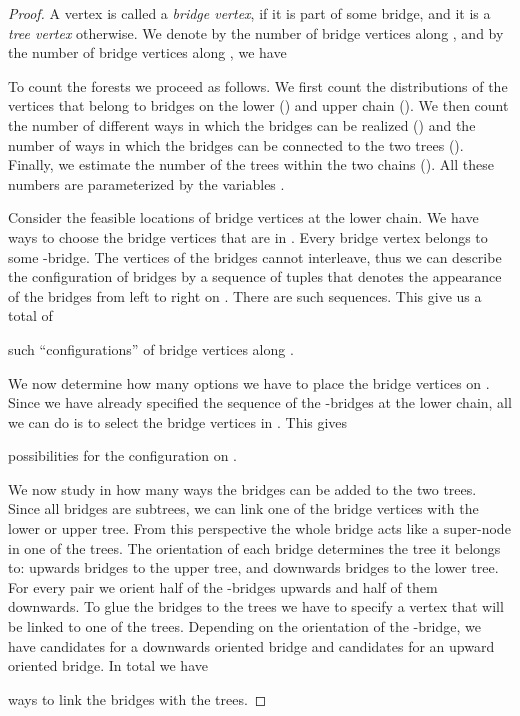 \documentclass[11pt]{article}
\begin{document}
\begin{proof}
A vertex is called a \emph{bridge vertex}, if it is part of
some bridge, and it is a \emph{tree vertex} otherwise.
We denote by  the number of bridge vertices along ,
and by 
the number of bridge vertices along , we have


To count the forests we proceed as follows. We first count the distributions of the
vertices that belong to bridges on the lower () and upper chain ().
We then count the number of different ways in which the bridges can be realized ()
and the number of ways in which the bridges can be connected to the two trees ().
Finally, we estimate the number of the trees within the two chains
(). All these numbers are parameterized by the
variables .

Consider the feasible locations of bridge vertices at the
lower chain. We have  ways to choose the bridge vertices
that are in . Every bridge vertex belongs to some -bridge. The vertices
of the bridges cannot interleave, thus we can describe the
configuration of bridges by a sequence of  tuples that denotes
the appearance of the  bridges from left to right on .
There are  such sequences. This give us a total of

such ``configurations'' of bridge vertices along .

We now determine how many options we have to place the bridge
vertices on . Since we have already specified the sequence of
the -bridges at the lower chain, all we can do is to select the bridge
vertices in . This gives

possibilities for the configuration on .

We now study in how many ways the bridges can be added to the two
trees. Since all bridges are subtrees, we can link one of the bridge
vertices with the lower or upper tree. From this perspective the whole
bridge acts like a super-node in one of the trees. The orientation
of each bridge determines the tree it belongs to: upwards
bridges to the upper tree, and downwards bridges to the lower tree.
For every pair  we orient half of the -bridges upwards
and half of them downwards. To glue the bridges to the trees we have
to specify a vertex that will be linked to one of the trees.
Depending on the orientation of the -bridge, we have 
candidates for a downwards oriented bridge and  candidates
for an upward oriented bridge. In total we have

ways to link the bridges with the trees.


\end{proof}
\end{document}
